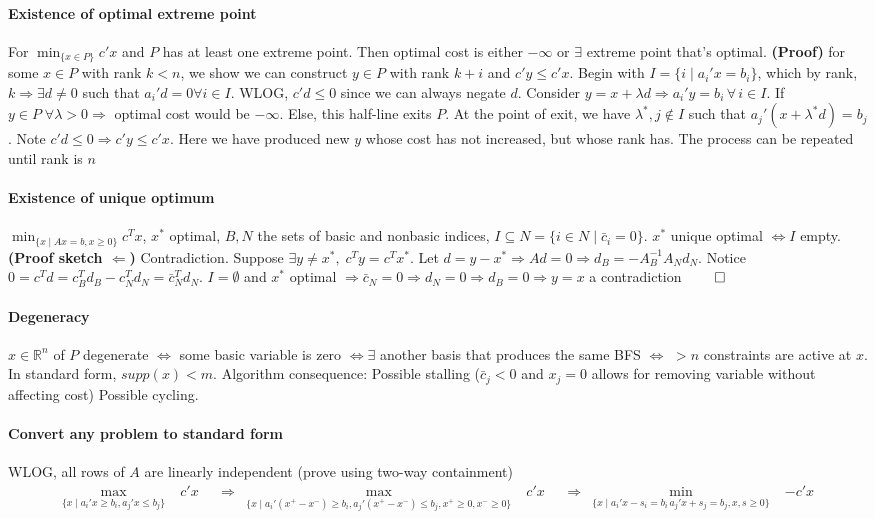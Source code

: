 \documentclass{article}
\begin{document}
\paragraph{Existence of optimal extreme point} For $\min_{\{x\in P\}}c'x$ and $P$ has at least one extreme point. Then optimal cost is either $-\infty$ or $\exists$ extreme point that's optimal. \textbf{(Proof)} for some $x \in P$ with rank $k < n$, we show we can construct $y\in P$ with rank $k+i$ and $c'y \leq c'x$. Begin with $I = \{i \mid a_i'x = b_i\}$, which by rank, $k \Rightarrow \exists d \neq 0$ such that $a_i'd = 0 \forall i \in I$. WLOG, $c'd \leq 0$ since we can always negate $d$. Consider $y = x + \lambda d \Rightarrow a_i'y = b_i \,\forall\, i \in I$. If $y \in P \;\forall \lambda > 0 \Rightarrow$ optimal cost would be $-\infty$. Else, this half-line exits $P$. At the point of exit, we have $\lambda^*, j \notin I$ such that $a_j'(x + \lambda^*d) = b_j$. Note $c'd \leq 0 \Rightarrow c'y \leq c'x$. Here we have produced new $y$ whose cost has not increased, but whose rank has. The process can be repeated until rank is $n$

\paragraph{Existence of unique optimum}  $\min_{\{x \mid Ax=b, x\geq0\}} c^Tx$, $x^*$ optimal, $B, N$ the sets of basic and nonbasic indices, $I\subseteq N = \{i \in N \mid \bar c_i = 0\}$. $x^*$ unique optimal $\iff I$ empty. \textbf{(Proof sketch $\Leftarrow$)} Contradiction. Suppose $\exists y \neq x^*,\; c^Ty = c^Tx^*$. Let $d = y - x^* \Rightarrow Ad = 0 \Rightarrow d_B = -A_B^{-1}A_Nd_N$. Notice $0 = c^Td = c_B^Td_B - c_N^Td_N = \bar c_N^Td_N$. $I = \emptyset$ and $x^*$ optimal $\Longrightarrow \bar c_N = 0 \Longrightarrow d_N = 0 \Longrightarrow d_B = 0 \Longrightarrow y = x$ a contradiction $\qed$ 

\paragraph{Degeneracy}
$x\in \mathbb R^n$ of $P$ degenerate $\iff $ some basic variable is zero $\iff \exists$ another basis that produces the same BFS $\iff$ $> n$ constraints are active at $x$. In standard form, $supp(x) < m$. Algorithm consequence: Possible stalling ($\bar c_j < 0$ and $x_j = 0$ allows for removing variable without affecting cost) Possible cycling.


\paragraph{Convert any problem to standard form} WLOG, all rows of $A$ are linearly independent (prove using two-way containment)
{\footnotesize
\begin{align*}
    \max_{\{x \mid a_i'x \geq b_i, a_j'x \leq b_j\}}\;& c'x 
    &&\Longrightarrow &
    \max_{\{x \mid a_i'(x^+ - x^-) \geq b_i, a_j'(x^+ - x^-) \leq b_j, x^+\geq 0,x^-\geq 0\}}\;& c'x 
    &&\Longrightarrow & 
    \min_{\{x \mid a_i'x - s_i = b_i\, a_j'x +s_j = b_j, x, s\geq 0\}}\;& -c'x
\end{align*}
}
\end{document}
